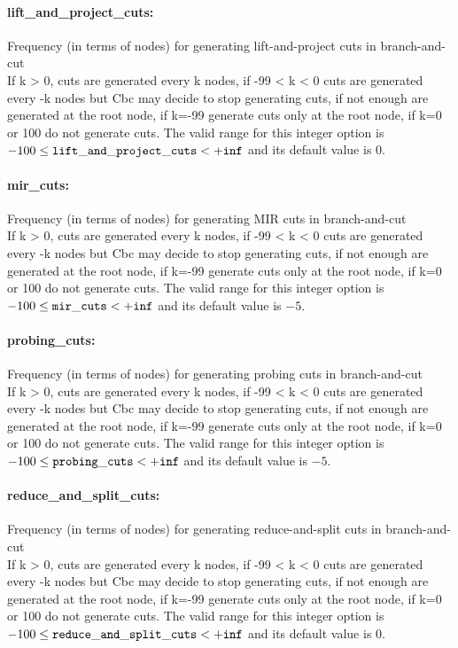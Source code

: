 \paragraph{lift\_and\_project\_cuts:} Frequency (in terms of nodes) for generating lift-and-project cuts in branch-and-cut $\;$ \\
 If k > 0, cuts are generated every k nodes, if
-99 < k < 0 cuts are generated every -k nodes but
Cbc may decide to stop generating cuts, if not
enough are generated at the root node, if k=-99
generate cuts only at the root node, if k=0 or
100 do not generate cuts. The valid range for this integer option is
$-100 \le {\tt lift\_and\_project\_cuts } <  {\tt +inf}$
and its default value is $0$.


\paragraph{mir\_cuts:} Frequency (in terms of nodes) for generating MIR cuts in branch-and-cut $\;$ \\
 If k > 0, cuts are generated every k nodes, if
-99 < k < 0 cuts are generated every -k nodes but
Cbc may decide to stop generating cuts, if not
enough are generated at the root node, if k=-99
generate cuts only at the root node, if k=0 or
100 do not generate cuts. The valid range for this integer option is
$-100 \le {\tt mir\_cuts } <  {\tt +inf}$
and its default value is $-5$.


\paragraph{probing\_cuts:} Frequency (in terms of nodes) for generating probing cuts in branch-and-cut $\;$ \\
 If k > 0, cuts are generated every k nodes, if
-99 < k < 0 cuts are generated every -k nodes but
Cbc may decide to stop generating cuts, if not
enough are generated at the root node, if k=-99
generate cuts only at the root node, if k=0 or
100 do not generate cuts. The valid range for this integer option is
$-100 \le {\tt probing\_cuts } <  {\tt +inf}$
and its default value is $-5$.


\paragraph{reduce\_and\_split\_cuts:} Frequency (in terms of nodes) for generating reduce-and-split cuts in branch-and-cut $\;$ \\
 If k > 0, cuts are generated every k nodes, if
-99 < k < 0 cuts are generated every -k nodes but
Cbc may decide to stop generating cuts, if not
enough are generated at the root node, if k=-99
generate cuts only at the root node, if k=0 or
100 do not generate cuts. The valid range for this integer option is
$-100 \le {\tt reduce\_and\_split\_cuts } <  {\tt +inf}$
and its default value is $0$.


